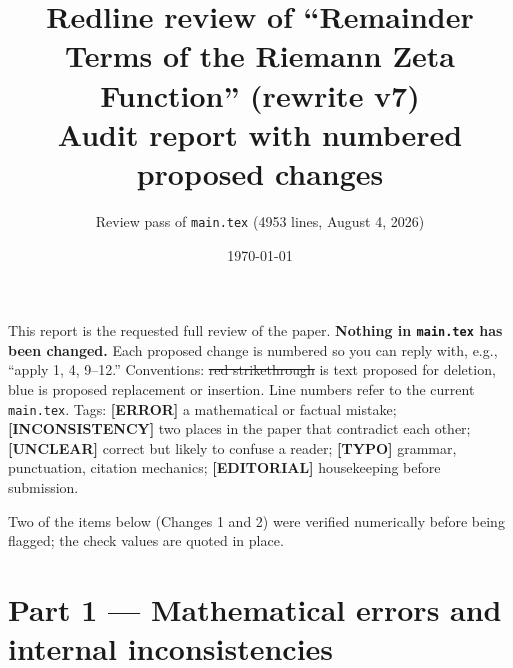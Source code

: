 \documentclass[11pt]{article}
\title{\textbf{Redline review of ``Remainder Terms of the Riemann Zeta Function'' (rewrite v7)}\\[0.4em]
\large Audit report with numbered proposed changes}
\author{Review pass of \texttt{main.tex} (4953 lines, August 4, 2026)}
\date{\today}
\newcommand{\del}[1]{\textcolor{delred}{\sout{#1}}}
\newcommand{\ins}[1]{\textcolor{insblue}{#1}}
\begin{document}
\maketitle

\noindent
This report is the requested full review of the paper. \textbf{Nothing in
\texttt{main.tex} has been changed.} Each proposed change is numbered so you can
reply with, e.g., ``apply 1, 4, 9--12.'' Conventions:
\del{red strikethrough} is text proposed for deletion, \ins{blue} is proposed
replacement or insertion. Line numbers refer to the current \texttt{main.tex}.
Tags: {\color{tagerr}\textbf{[ERROR]}} a mathematical or factual mistake;
{\color{taginc}\textbf{[INCONSISTENCY]}} two places in the paper that contradict
each other; {\color{tagunc}\textbf{[UNCLEAR]}} correct but likely to confuse a
reader; {\color{tagtyp}\textbf{[TYPO]}} grammar, punctuation, citation
mechanics; {\color{tagedt}\textbf{[EDITORIAL]}} housekeeping before submission.

\medskip\noindent
Two of the items below (Changes 1 and 2) were verified numerically before being
flagged; the check values are quoted in place.

\section*{Part 1 --- Mathematical errors and internal inconsistencies}
\end{document}
